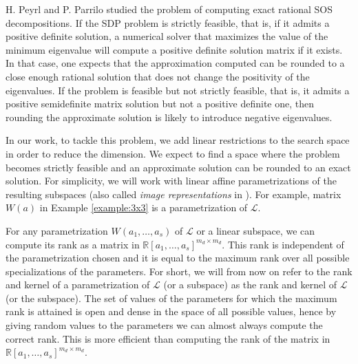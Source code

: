 \documentclass{amsart}
\theoremstyle{definition}
\theoremstyle{remark}
\numberwithin{equation}{section}
\newcommand{\Sym}{{\mathcal S}}
\newcommand{\eLL}{{\mathcal L}}
\newcommand{\QQ}{{\mathcal Q}}
\newcommand{\R}{{\mathbb R}}
\begin{document}

H. Peyrl and P. Parrilo \cite{parrilo} studied the problem of computing exact rational SOS decompositions.
If the SDP problem is strictly feasible, that is, if it admits a positive definite solution, a numerical solver that maximizes the value of the minimum eigenvalue will compute a positive definite solution matrix if it exists.
In that case, one expects that the approximation computed can be rounded to a close enough rational solution that does not change the positivity of the eigenvalues.
 If the problem is feasible but not strictly feasible, that is, it admits a positive semidefinite matrix solution but not a positive definite one, then rounding the approximate solution is likely to introduce negative eigenvalues.

In our work, to tackle this problem, we add linear restrictions to the search space in order to reduce the dimension. We expect to find a space where the problem becomes strictly feasible and an approximate solution can be rounded to an exact solution. For simplicity, we will work with linear affine parametrizations of the resulting subspaces (also called \emph{image representations} in \cite[Section 3.2]{parrilo}). For example, matrix $W(a)$ in Example \ref{example:3x3} is a parametrization of $\eLL$.


For any parametrization $W(a_1, \dots, a_s)$ of $\eLL$ or a linear subspace, we can compute its rank as a matrix in $\R[a_1, \dots, a_s]^{m_d \times m_d}$. This rank is independent of the parametrization chosen and it is equal to the maximum rank over all possible specializations of the parameters. For short, we will from now on refer to the rank and kernel of a parametrization of $\eLL$ (or a subspace) as the rank and kernel of $\eLL$ (or the subspace). The set of values of the parameters for which the maximum rank is attained is open and dense in the space of all possible values, hence by giving random values to the parameters we can almost always compute the correct rank. This is more efficient than computing the rank of the matrix in $\R[a_1, \dots, a_s]^{m_d \times m_d}$. 
\end{document}
